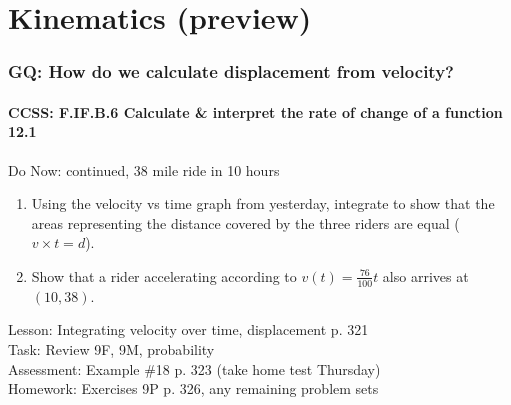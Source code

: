 \documentclass{beamer}
\begin{document}
  \section{Kinematics (preview)}
  \frame
  {
    \frametitle{GQ: How do we calculate displacement from velocity?}
    \framesubtitle{CCSS: F.IF.B.6 Calculate \& interpret the rate of change of a function \qquad \alert{12.1}}

    \begin{block}{Do Now: continued, 38 mile ride in 10 hours}
    \begin{enumerate}
        \item Using the velocity vs time graph from yesterday, integrate to show that the areas representing the distance covered by the three riders are equal ($v \times t = d$).
        \item Show that a rider accelerating according to $v(t)= \frac{76}{100}t$ also arrives at $(10,38)$.
    \end{enumerate}
    \end{block}
    Lesson: Integrating velocity over time, displacement p. 321\\%
    Task: Review 9F, 9M, probability\\%
    Assessment: Example \#18 p. 323 (take home test Thursday)\\%
    Homework: Exercises 9P p. 326, any remaining problem sets
  }
\end{document}
